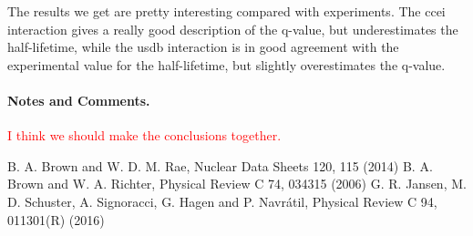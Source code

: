 \documentclass{llncs}
\begin{document}
The results we get are pretty interesting compared with experiments. The ccei interaction gives a really good description of the q-value, but underestimates the half-lifetime, while the usdb interaction is in good agreement with the experimental value for the half-lifetime, but slightly overestimates the q-value.

%
\paragraph{Notes and Comments.}
\textcolor{red}{I think we should make the conclusions together.}

%
%
\begin{thebibliography}{3}
%
B. A. Brown and W. D. M. Rae, Nuclear Data Sheets 120, 115 (2014)
B. A. Brown and W. A. Richter, Physical Review C 74, 034315 (2006)
G. R. Jansen, M. D. Schuster, A. Signoracci, G. Hagen and P. Navr\'atil, Physical Review C 94, 011301(R) (2016)

\end{thebibliography}
\end{document}
